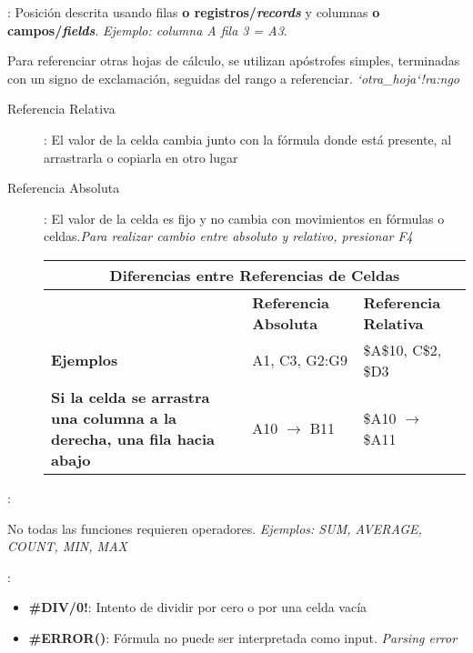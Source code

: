 \begin{description}
    \item[Celda]{: Posición descrita usando filas \textbf{o registros/\textit{records}} y columnas \textbf{o campos/\textit{fields}}. \textit{Ejemplo: columna A fila 3 = A3}. 
    \item {Para referenciar otras hojas de cálculo, se utilizan apóstrofes simples, terminadas con un signo de exclamación, seguidas del rango a referenciar. \textit{`otra\_hoja`!ra:ngo}}
    \begin{description}
        \item[Referencia Relativa]{: El valor de la celda cambia junto con la fórmula donde está presente, al arrastrarla o copiarla en otro lugar}
        \item[Referencia Absoluta]{: El valor de la celda es fijo y no cambia con movimientos en fórmulas o celdas.\textit{Para realizar cambio entre absoluto y relativo, presionar F4}}
        \begin{table}
            \centering
            \begin{tabular}{|p{5cm}|p{4.5cm}|p{4.5cm}|}
                \hline
                \multicolumn{3}{|c|}{Diferencias entre Referencias de Celdas} \\
                \hline
                & \textbf{Referencia Absoluta} & \textbf{Referencia Relativa} \\
                \hline
                \textbf{Ejemplos} & A1, C3, G2:G9 & \$A\$10, C\$2, \$D3 \\
                \hline
                \textbf{Si la celda se arrastra una columna a la derecha, una fila hacia abajo} & A10 $\rightarrow$ B11 & \$A10 $\rightarrow$ \$A11 \\
                \hline
            \end{tabular}
        \end{table}
    \end{description}}
    \item[Fórmulas y Funciones]{: 
    \begin{description}
        \item {No todas las funciones requieren operadores. \textit{Ejemplos: SUM, AVERAGE, COUNT, MIN, MAX}}
        \item[Errores Comunes]{: 
        \begin{itemize}
            \item {\textbf{\#DIV/0!}: Intento de dividir por cero o por una celda vacía}
            \item {\textbf{\#ERROR()}: Fórmula no puede ser interpretada como input. \textit{Parsing error}}

\end{itemize}}
\end{description}}
\end{description}
